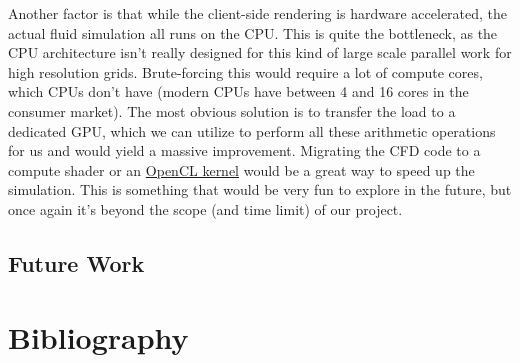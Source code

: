 \documentclass[a4paper,12pt,titlepage]{article}
\begin{document}
Another factor is that while the client-side rendering is hardware accelerated,
the actual fluid simulation all runs on the CPU. This is quite the bottleneck,
as the CPU architecture isn't really designed for this kind of large scale
parallel work for high resolution grids. Brute-forcing this would require a lot
of compute cores, which CPUs don't have (modern CPUs have between 4 and 16 cores
in the consumer market). The most obvious solution is to transfer the load to
a dedicated GPU, which we can utilize to perform all these arithmetic operations
for us and would yield a massive improvement. Migrating the CFD code to a compute
shader or an \href{https://en.wikipedia.org/wiki/OpenCL}{OpenCL kernel} would
be a great way to speed up the simulation. This is something that would be very
fun to explore in the future, but once again it's beyond the scope (and time limit)
of our project.

\subsection{Future Work}

\pagebreak
\section{Bibliography}
\nocite{*}
\printbibliography
\end{document}
